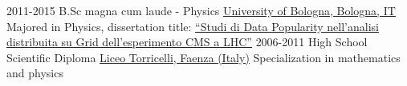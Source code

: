 \documentclass[]{cv-style}     %
\begin{document}
\begin{entrylist}
{%
%
}
\entry
{2011-2015}
{B.Sc magna cum laude - Physics}
{\href{http://http://www.unibo.it/en}{University of Bologna, Bologna, IT}}
{Majored in Physics, dissertation title:
\href{http://www.infn.it/thesis/PDF/getfile.php?filename=9796-Neri-triennale.pdf}
{``Studi di Data Popularity nell'analisi distribuita su Grid dell'esperimento CMS a LHC''}}
\entry
{2006-2011}
{High School Scientific Diploma}
{\href{http://www.liceotorricelli.it/}{Liceo Torricelli, Faenza (Italy)}}
{Specialization in mathematics and physics}
\end{entrylist}
\end{document}
